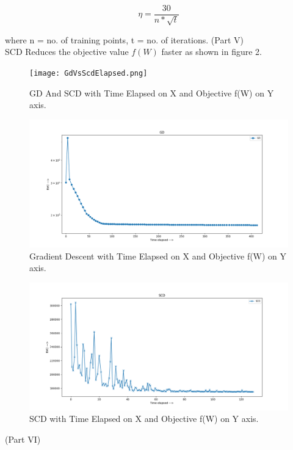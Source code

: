 \documentclass[a4paper,11pt]{article}
\begin{document}
\begin{mlsolution}
\[
\eta = \frac{30}{n*\sqrt{t}}
\]

where n = no. of training points, t = no. of iterations.
\newpage
(Part V)\\

SCD Reduces the objective value $f(W)$ faster as shown in figure 2.

\begin{figure}[th]%
\centering
\texttt{[image: GdVsScdElapsed.png]}%

\caption{GD And SCD with Time Elapsed on X and Objective f(W) on Y axis.}%
\label{fig:GD3}%
\end{figure}
\begin{figure}[th]%
\centering
\includegraphics[width=1.2\columnwidth]{GD-elapsed.png}%

\caption{Gradient Descent with Time Elapsed on X and Objective f(W) on Y axis.}%
\label{fig:GD1}%
\end{figure}
\begin{figure}[th]%
\centering
\includegraphics[width=1.2\columnwidth]{SCD-elapsed.png}%

\caption{SCD with Time Elapsed on X and Objective f(W) on Y axis.}%
\label{fig:SCD1}%
\end{figure}


\newpage
(Part VI)


\end{mlsolution}
\end{document}
